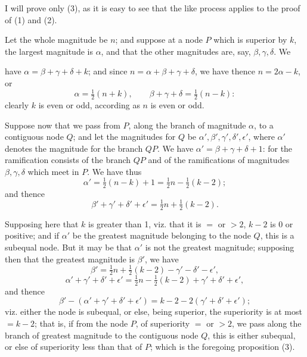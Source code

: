 \documentclass[10pt,twoside]{article}
\begin{document}
I will prove only (3), as it is easy to see that the like process applies to the
proof of (1) and (2).

Let the whole magnitude be \(n\); and suppose at a node \(P\) which is superior
by \(k\), the largest magnitude is \(\alpha\), and that the other magnitudes are,
say, \(\beta,\gamma,\delta\). We

\newpage

have \(\alpha=\beta+\gamma+\delta+k\); and since
\(n=\alpha+\beta+\gamma+\delta\), we have thence \(n=2\alpha-k\), or
\[
\alpha=\tfrac12(n+k),\qquad
\beta+\gamma+\delta=\tfrac12(n-k):
\]
clearly \(k\) is even or odd, according as \(n\) is even or odd.

Suppose now that we pass from \(P\), along the branch of magnitude \(\alpha\),
to a contiguous node \(Q\); and let the magnitudes for \(Q\) be
\(\alpha',\beta',\gamma',\delta',\epsilon'\), where \(\alpha'\) denotes the
magnitude for the branch \(QP\). We have
\(\alpha'=\beta+\gamma+\delta+1\): for the ramification consists of the branch
\(QP\) and of the ramifications of magnitudes \(\beta,\gamma,\delta\) which
meet in \(P\). We have thus
\[
        \alpha'=\tfrac12(n-k)+1=\tfrac12n-\tfrac12(k-2);
\]
and thence
\[
        \beta'+\gamma'+\delta'+\epsilon'
        =\tfrac12n+\tfrac12(k-2).
\]

Supposing here that \(k\) is greater than 1, viz. that it is \(=\) or \(>2\),
\(k-2\) is 0 or positive; and if \(\alpha'\) be the greatest magnitude belonging
to the node \(Q\), this is a subequal node. But it may be that \(\alpha'\) is
not the greatest magnitude; supposing then that the greatest magnitude is
\(\beta'\), we have
\[
\beta'=\tfrac12n+\tfrac12(k-2)-\gamma'-\delta'-\epsilon',
\]
\[
\alpha'+\gamma'+\delta'+\epsilon'
=\tfrac12n-\tfrac12(k-2)+\gamma'+\delta'+\epsilon',
\]
and thence
\[
\beta'-(\alpha'+\gamma'+\delta'+\epsilon')
=k-2-2(\gamma'+\delta'+\epsilon');
\]
viz. either the node is subequal, or else, being superior, the superiority is at
most \(=k-2\); that is, if from the node \(P\), of superiority \(=\) or \(>2\),
we pass along the branch of greatest magnitude to the contiguous node \(Q\),
this is either subequal, or else of superiority less than that of \(P\); which
is the foregoing proposition (3).
\end{document}
